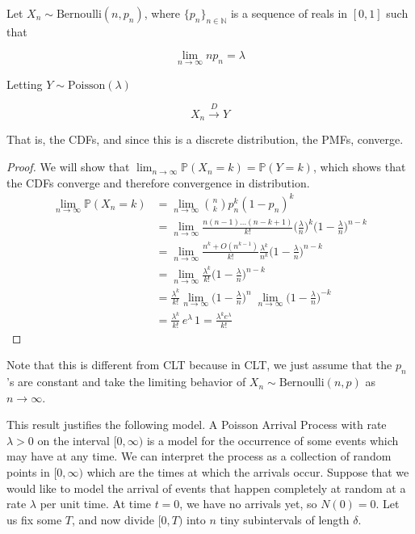 \documentclass{article}
\begin{document}
    \begin{theorem}
      Let $X_n \sim \mathrm{Bernoulli}(n, p_n)$, where $\{p_n\}_{n \in \mathbb{N}}$ is a sequence of reals in $[0, 1]$ such that 

        \[\lim_{n \rightarrow \infty} n p_n = \lambda\]

      Letting $Y \sim \mathrm{Poisson}(\lambda)$

        \[X_n \xrightarrow{D} Y\]

      That is, the CDFs, and since this is a discrete distribution, the PMFs, converge. 
    \end{theorem}
    \begin{proof}
      We will show that $\lim_{n \rightarrow \infty} \mathbb{P}(X_n = k) = \mathbb{P}(Y = k)$, which shows that the CDFs converge and therefore convergence in distribution. 
      \begin{align*}
        \lim_{n \rightarrow \infty} \mathbb{P}(X_n = k) & = \lim_{n \rightarrow \infty} \binom{n}{k} p_n^k (1 - p_n)^k \\
        & = \lim_{n \rightarrow \infty} \frac{n (n - 1) \ldots (n - k + 1)}{k!} \bigg(\frac{\lambda}{n}\bigg)^k \bigg( 1 - \frac{\lambda}{n} \bigg)^{n - k} \\
        & = \lim_{n \rightarrow \infty} \frac{n^k + O(n^{k-1})}{k!} \frac{\lambda^k}{n^k} \bigg( 1 - \frac{\lambda}{n} \bigg)^{n - k} \\
        & = \lim_{n \rightarrow \infty} \frac{\lambda^k}{k!} \bigg( 1 - \frac{\lambda}{n} \bigg)^{n - k} \\
        & = \frac{\lambda^k}{k!} \lim_{n \rightarrow \infty} \bigg( 1 - \frac{\lambda}{n} \bigg)^n \; \lim_{n \rightarrow \infty} \bigg( 1 - \frac{\lambda}{n} \bigg)^{-k} \\
        & = \frac{\lambda^k}{k!} \, e^{\lambda} \, 1 = \frac{\lambda^k e^\lambda}{k!}
      \end{align*}
    \end{proof}

    Note that this is different from CLT because in CLT, we just assume that the $p_n$'s are constant and take the limiting behavior of $X_n \sim \mathrm{Bernoulli}(n, p)$ as $n \rightarrow \infty$. 

    This result justifies the following model. A Poisson Arrival Process with rate $\lambda > 0$ on the interval $[0, \infty)$ is a model for the occurrence of some events which may have at any time. We can interpret the process as a collection of random points in $[0, \infty)$ which are the times at which the arrivals occur. Suppose that we would like to model the arrival of events that happen completely at random at a rate $\lambda$ per unit time. At time $t = 0$, we have no arrivals yet, so $N(0) = 0$. Let us fix some $T$, and now divide $[0, T)$ into $n$ tiny subintervals of length $\delta$. 
\end{document}

